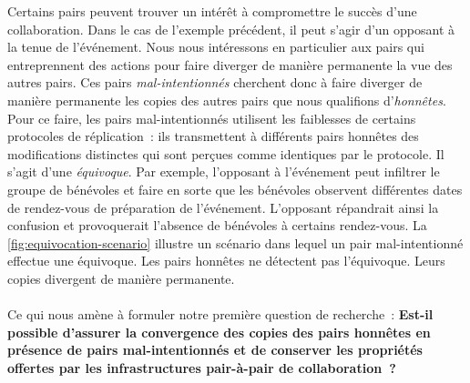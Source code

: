 Certains pairs peuvent trouver un intérêt à compromettre le succès d'une collaboration.
Dans le cas de l'exemple précédent, il peut s'agir d'un opposant à la tenue de l'événement.
Nous nous intéressons en particulier aux pairs qui entreprennent des actions pour faire diverger de manière permanente la vue des autres pairs.
Ces pairs \emph{mal-intentionnés} cherchent donc à faire diverger de manière permanente les copies des autres pairs que nous qualifions d'\emph{honnêtes}.
Pour ce faire, les pairs mal-intentionnés utilisent les faiblesses de certains protocoles de réplication~: ils transmettent à différents pairs honnêtes des modifications distinctes qui sont perçues comme identiques par le protocole.
Il s'agit d'une \emph{équivoque}.
Par exemple, l'opposant à l'événement peut infiltrer le groupe de bénévoles et faire en sorte que les bénévoles observent différentes dates de rendez-vous de préparation de l'événement.
L'opposant répandrait ainsi la confusion et provoquerait l'absence de bénévoles à certains rendez-vous.
La \autoref{fig:equivocation-scenario} illustre un scénario dans lequel un pair mal-intentionné effectue une équivoque.
Les pairs honnêtes ne détectent pas l'équivoque.
Leurs copies divergent de manière permanente.

\paragraph{}Ce qui nous amène à formuler notre première question de recherche~: \textbf{Est-il possible d'assurer la convergence des copies des pairs honnêtes en présence de pairs mal-intentionnés et de conserver les propriétés offertes par les infrastructures pair-à-pair de collaboration~?}

\clearpage %

